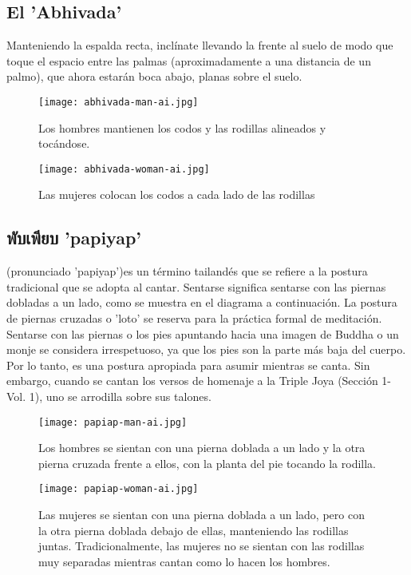 \subsection{El 'Abhivada'}
Manteniendo la espalda recta, inclínate llevando la frente al suelo de modo que toque el espacio entre las palmas (aproximadamente a una distancia de un palmo), que ahora estarán boca abajo, planas sobre el suelo.
\begin{figure}[h]
	\centering
	\begin{minipage}{0.40\textwidth}
		\centering
		\texttt{[image: abhivada-man-ai.jpg]}
		\caption{Los hombres mantienen los codos y las rodillas alineados y tocándose.}
	\end{minipage}
	\hfill
	\begin{minipage}{0.40\textwidth}
		\centering
		\texttt{[image: abhivada-woman-ai.jpg]}
		\caption{Las mujeres colocan los codos a cada lado de las rodillas}
	\end{minipage}
\end{figure}

\subsection{\thaiFont พับเพียบ 'papiyap'}

 \normalfont(pronunciado 'papiyap')es un término tailandés que se refiere a la postura tradicional que se adopta al cantar. Sentarse  \normalfont significa sentarse con las piernas dobladas a un lado, como se muestra en el diagrama a continuación. La postura de piernas cruzadas o 'loto' se reserva para la práctica formal de meditación. Sentarse con las piernas o los pies apuntando hacia una imagen de Buddha o un monje se considera irrespetuoso, ya que los pies son la parte más baja del cuerpo. Por lo tanto,  \normalfont es una postura apropiada para asumir mientras se canta. Sin embargo, cuando se cantan los versos de homenaje a la Triple Joya (Sección 1-Vol. 1), uno se arrodilla sobre sus talones. 
\enlargethispage{3\baselineskip}
\begin{figure}[h]
	\centering
	
	\begin{minipage}{0.49\textwidth}
		\centering
		\texttt{[image: papiap-man-ai.jpg]}
		\caption{Los hombres se sientan con una pierna doblada a un lado y la otra pierna cruzada frente a ellos, con la planta del pie tocando la rodilla.}
	\end{minipage}
	\hfill
	\begin{minipage}{0.49\textwidth}
		\centering
		\texttt{[image: papiap-woman-ai.jpg]}
		\caption{Las mujeres se sientan con una pierna doblada a un lado, pero con la otra pierna doblada debajo de ellas, manteniendo las rodillas juntas. Tradicionalmente, las mujeres no se sientan con las rodillas muy separadas mientras cantan como lo hacen los hombres.}
	\end{minipage}
	
\end{figure}

